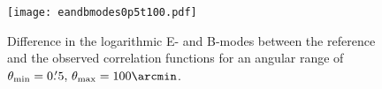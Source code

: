 \begin{figure}
\centering
\texttt{[image: eandbmodes0p5t100.pdf]}
\caption[Difference in E- and B-modes between the reference and the observed correlation functions]{Difference in the logarithmic E- and B-modes between the reference and the observed correlation functions for an angular range of $\theta_{\rm{min}}=0.\!^\prime 5,\,\theta_{\rm{max}}=100\arcmin$.}
\label{fig:cosebis_eandb}
\end{figure}


